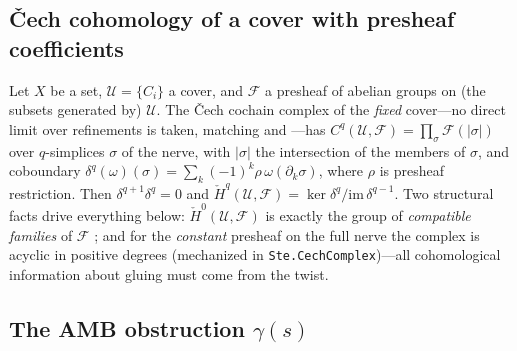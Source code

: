 \documentclass[11pt]{article}
\newcommand{\lean}[1]{\texttt{#1}}
\newcommand{\cech}{\v{C}ech}
\newcommand{\Hc}[1]{\check{H}^{#1}}
\begin{document}
\subsection{\cech{} cohomology of a cover with presheaf coefficients}

Let $X$ be a set, $\mathcal{U} = \{C_i\}$ a cover, and $\mathcal{F}$ a
presheaf of abelian groups on (the subsets generated by) $\mathcal{U}$.
The \cech{} cochain complex of the \emph{fixed} cover---no direct limit
over refinements is taken, matching \citet[Ch.~II]{bott1982forms} and
\citet[\S3]{abramsky2012cohomology}---has
$C^q(\mathcal{U},\mathcal{F}) = \prod_{\sigma}
\mathcal{F}(|\sigma|)$ over $q$-simplices $\sigma$ of the nerve, with
$|\sigma|$ the intersection of the members of $\sigma$, and coboundary
$\delta^q(\omega)(\sigma) = \sum_k (-1)^k
\rho\,\omega(\partial_k\sigma)$, where $\rho$ is presheaf restriction.
Then $\delta^{q+1}\delta^q = 0$ and $\Hc{q}(\mathcal{U},\mathcal{F}) =
\ker \delta^q / \mathrm{im}\, \delta^{q-1}$.  Two structural facts
drive everything below: $\Hc{0}(\mathcal{U},\mathcal{F})$ is exactly
the group of \emph{compatible families} of $\mathcal{F}$
\citep[Prop.~3.2]{abramsky2012cohomology}; and for the \emph{constant}
presheaf on the full nerve the complex is acyclic in positive degrees
(mechanized in \lean{Ste.CechComplex})---all cohomological information
about gluing must come from the twist.

\subsection{The AMB obstruction $\gamma(s)$}
\end{document}
